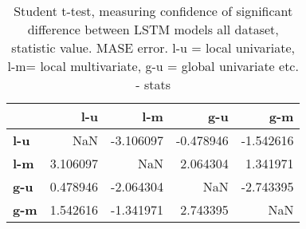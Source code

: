 \begin{table}[H]
\centering
\caption{Student t-test, measuring confidence of significant difference between LSTM models all dataset, statistic value. MASE error. l-u = local univariate, l-m= local multivariate, g-u = global univariate etc. - stats}
\label{table:ttest-stats-lstm-experiments-MASE-all-datasets}
\begin{tabular}{lrrrr}
\toprule
{} &       l-u &       l-m &       g-u &       g-m \\
\midrule
\textbf{l-u} &       NaN & -3.106097 & -0.478946 & -1.542616 \\
\textbf{l-m} &  3.106097 &       NaN &  2.064304 &  1.341971 \\
\textbf{g-u} &  0.478946 & -2.064304 &       NaN & -2.743395 \\
\textbf{g-m} &  1.542616 & -1.341971 &  2.743395 &       NaN \\
\bottomrule
\end{tabular}
\end{table}
